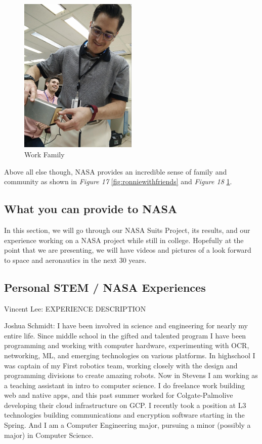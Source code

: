 \documentclass{article}
\let\Oldsubsection\subsection
\renewcommand{\subsection}{\FloatBarrier\Oldsubsection}
\begin{document}
\begin{figure}[!htb]
  \centering
  \includegraphics[width=0.5\textwidth]{assets/guywithpsu.jpg}
  \caption{Work Family}
  \label{fig:guywithpsu}
\end{figure}

Above all else though, NASA provides an incredible sense of family and community as shown in \textit{Figure 17} \ref{fig:ronniewithfriends} and \textit{Figure 18} \ref{fig:guywithpsu}.

\subsection{What you can provide to NASA}

In this section, we will go through our NASA Suits Project, its results, and our experience working on a NASA project while still in college. Hopefully at the point that we are presenting, we will have videos and pictures of a look forward to space and aeronautics in the next 30 years.

\subsection{Personal STEM / NASA Experiences}

Vincent Lee: EXPERIENCE DESCRIPTION

Joshua Schmidt: I have been involved in science and engineering for nearly my entire life. Since middle school in the gifted and talented program I have been programming and working with computer hardware, experimenting with OCR, networking, ML, and emerging technologies on various platforms. In highschool I was captain of my First robotics team, working closely with the design and programming divisions to create amazing robots. Now in Stevens I am working as a teaching assistant in intro to computer science. I do freelance work building web and native apps, and this past summer worked for Colgate-Palmolive developing their cloud infrastructure on GCP. I recently took a position at L3 technologies building communications and encryption software starting in the Spring. And I am a Computer Engineering major, pursuing a minor (possibly a major) in Computer Science.
\end{document}
